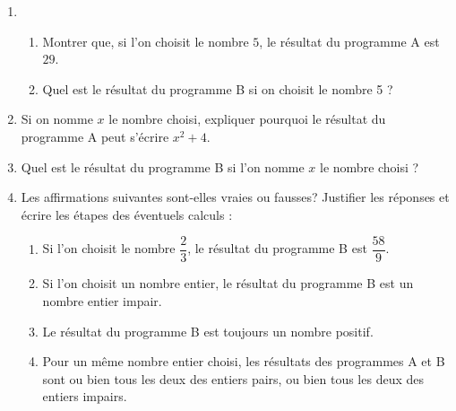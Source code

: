 \documentclass[10pt]{article}
\begin{document}
\medskip

\begin{enumerate}
\item 
	\begin{enumerate}
		\item Montrer que, si l'on choisit le nombre $5$, le résultat du programme A est $29$.
		\item Quel est le résultat du programme B si on choisit le nombre 5 ?
	\end{enumerate}
\item Si on nomme $x$ le nombre choisi, expliquer pourquoi le résultat du programme A peut s'écrire $x^2 + 4$.
\item Quel est le résultat du programme B si l'on nomme $x$ le nombre choisi ?
\item Les affirmations suivantes sont-elles vraies ou fausses? Justifier les réponses et écrire les étapes des éventuels calculs :
	\begin{enumerate}
		\item \og Si l'on choisit le nombre $\dfrac{2}{3}$, le résultat du programme B est $\dfrac{58}{9}$. \fg
		\item \og Si l'on choisit un nombre entier, le résultat du programme B est un nombre entier impair. \fg
		\item \og Le résultat du programme B est toujours un nombre positif. \fg
		\item \og Pour un même nombre entier choisi, les résultats des programmes A et B sont ou bien tous les deux des entiers pairs, ou bien tous les deux des entiers impairs. \fg
	\end{enumerate}
\end{enumerate}

\bigskip
\end{document}
